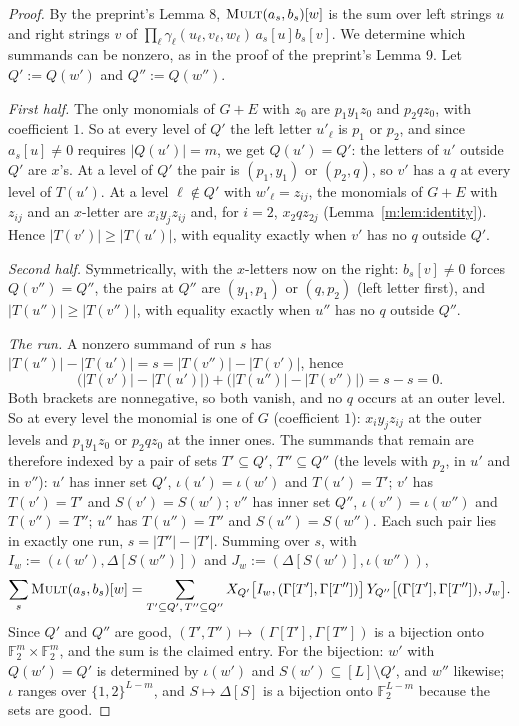 \documentclass[11pt]{article}
\theoremstyle{definition}
\theoremstyle{remark}
\newcommand{\F}{\mathbb{F}_2}
\newcommand{\Mult}{\textnormal{\textsc{Mult}}}
\begin{document}
\begin{proof}
By the preprint's Lemma 8, $\Mult(a_s,b_s)[w]$ is the sum over left strings $u$ and right strings $v$ of $\prod_\ell\gamma_\ell(u_\ell,v_\ell,w_\ell)\,a_s[u]b_s[v]$. We determine which summands can be nonzero, as in the proof of the preprint's Lemma 9. Let $Q':=Q(w')$ and $Q'':=Q(w'')$.

\emph{First half.} The only monomials of $G+E$ with $z_0$ are $p_1y_1z_0$ and $p_2qz_0$, with coefficient $1$. So at every level of $Q'$ the left letter $u'_\ell$ is $p_1$ or $p_2$, and since $a_s[u]\ne0$ requires $|Q(u')|=m$, we get $Q(u')=Q'$: the letters of $u'$ outside $Q'$ are $x$'s. At a level of $Q'$ the pair is $(p_1,y_1)$ or $(p_2,q)$, so $v'$ has a $q$ at every level of $T(u')$. At a level $\ell\notin Q'$ with $w'_\ell=z_{ij}$, the monomials of $G+E$ with $z_{ij}$ and an $x$-letter are $x_iy_jz_{ij}$ and, for $i=2$, $x_2qz_{2j}$ (Lemma~\ref{m:lem:identity}). Hence $|T(v')|\ge|T(u')|$, with equality exactly when $v'$ has no $q$ outside $Q'$.

\emph{Second half.} Symmetrically, with the $x$-letters now on the right: $b_s[v]\ne0$ forces $Q(v'')=Q''$, the pairs at $Q''$ are $(y_1,p_1)$ or $(q,p_2)$ (left letter first), and $|T(u'')|\ge|T(v'')|$, with equality exactly when $u''$ has no $q$ outside $Q''$.

\emph{The run.} A nonzero summand of run $s$ has $|T(u'')|-|T(u')|=s=|T(v'')|-|T(v')|$, hence
\[
\big(|T(v')|-|T(u')|\big)+\big(|T(u'')|-|T(v'')|\big)=s-s=0 .
\]
Both brackets are nonnegative, so both vanish, and no $q$ occurs at an outer level. So at every level the monomial is one of $G$ (coefficient $1$): $x_iy_jz_{ij}$ at the outer levels and $p_1y_1z_0$ or $p_2qz_0$ at the inner ones. The summands that remain are therefore indexed by a pair of sets $T'\subseteq Q'$, $T''\subseteq Q''$ (the levels with $p_2$, in $u'$ and in $v''$): $u'$ has inner set $Q'$, $\iota(u')=\iota(w')$ and $T(u')=T'$; $v'$ has $T(v')=T'$ and $S(v')=S(w')$; $v''$ has inner set $Q''$, $\iota(v'')=\iota(w'')$ and $T(v'')=T''$; $u''$ has $T(u'')=T''$ and $S(u'')=S(w'')$. Each such pair lies in exactly one run, $s=|T''|-|T'|$. Summing over $s$, with $I_w:=(\iota(w'),\Delta[S(w'')])$ and $J_w:=(\Delta[S(w')],\iota(w''))$,
\[
\sum_s\Mult(a_s,b_s)[w]=\sum_{T'\subseteq Q',\,T''\subseteq Q''}X_{Q'}\big[I_w,(\Gamma[T'],\Gamma[T''])\big]\,Y_{Q''}\big[(\Gamma[T'],\Gamma[T'']),J_w\big].
\]
Since $Q'$ and $Q''$ are good, $(T',T'')\mapsto(\Gamma[T'],\Gamma[T''])$ is a bijection onto $\F^m\times\F^m$, and the sum is the claimed entry. For the bijection: $w'$ with $Q(w')=Q'$ is determined by $\iota(w')$ and $S(w')\subseteq[L]\setminus Q'$, and $w''$ likewise; $\iota$ ranges over $\{1,2\}^{L-m}$, and $S\mapsto \Delta[S]$ is a bijection onto $\F^{L-m}$ because the sets are good.
\end{proof}
\end{document}
